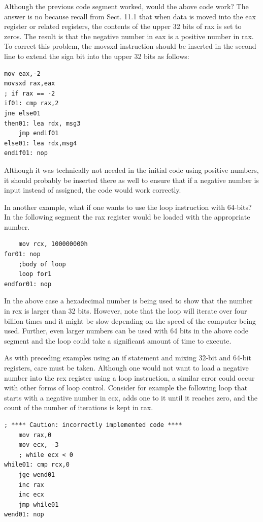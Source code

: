 \documentclass[10pt]{book}
\begin{document}
Although the previous code segment worked, would the above code work? The answer is no because recall from Sect. 11.1 that when data is moved into the eax register or related registers, the contents of the upper 32 bits of rax is set to zeros. The result is that the negative number in eax is a positive number in rax. To correct this problem, the movsxd instruction should be inserted in the second line to extend the sign bit into the upper 32 bits as follows:


\begin{verbatim}
mov eax,-2
movsxd rax,eax
; if rax == -2
if01: cmp rax,2
jne else01
then01: lea rdx, msg3
    jmp endif01
else01: lea rdx,msg4
endif01: nop
\end{verbatim}

Although it was technically not needed in the initial code using positive numbers, it should probably be inserted there as well to ensure that if a negative number is input instead of assigned, the code would work correctly.

In another example, what if one wants to use the loop instruction with 64-bits? In the following segment the rax register would be loaded with the appropriate number.

\begin{verbatim}
    mov rcx, 100000000h
for01: nop
    ;body of loop
    loop for1
endfor01: nop
\end{verbatim}

In the above case a hexadecimal number is being used to show that the number in rcx is larger than 32 bits. However, note that the loop will iterate over four billion times and it might be slow depending on the speed of the computer being used. Further, even larger numbers can be used with 64 bits in the above code segment and the loop could take a significant amount of time to execute.

As with preceding examples using an if statement and mixing 32-bit and 64-bit registers, care must be taken. Although one would not want to load a negative number into the rcx register using a loop instruction, a similar error could occur with other forms of loop control. Consider for example the following loop that starts with a negative number in ecx, adds one to it until it reaches zero, and the count of the number of iterations is kept in rax.


\begin{verbatim}
; **** Caution: incorrectly implemented code ****
    mov rax,0
    mov ecx, -3
    ; while ecx < 0
while01: cmp rcx,0
    jge wend01
    inc rax
    inc ecx
    jmp while01
wend01: nop
\end{verbatim}
\end{document}
